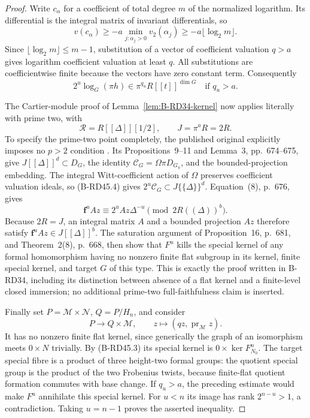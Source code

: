 \begin{proof}
Write $c_\alpha$ for a coefficient of total degree $m$ of
the normalized logarithm. Its differential is the integral
matrix of invariant differentials, so
\[
 v(c_\alpha)\ge
 -a\min_{j:\alpha_j>0}v_2(\alpha_j)
 \ge-a\lfloor\log_2m\rfloor.
\]
Since $\lfloor\log_2m\rfloor\le m-1$, substitution of a
vector of coefficient valuation $q>a$ gives logarithm
coefficient valuation at least $q$. All substitutions are
coefficientwise finite because the vectors have zero constant
term. Consequently
\[
        2^u\log_G(\pi h)\in\pi^{q_u}R[[t]]^{\dim G}
                  \quad\text{if }q_u>a.
 \tag{B-RD45.4}
\]

The Cartier-module proof of Lemma~\ref{lem:B-RD34-kernel}
now applies literally with prime two, with
\[
 \mathcal R=R[[\Delta]][1/2],\qquad J=\pi^aR=2R.
\]
To specify the prime-two point completely, the published original
explicitly imposes no $p>2$ condition
\cite[p.~663]{Bondarko2006Generic}.
Its Propositions~9--11 and Lemma~3, pp.~674--675, give
$J[[\Delta]]^d\subset D_G$, the identity
$\mathcal C_G=\Omega\pi D_{G_\pi}$, and the bounded-projection
embedding. The integral Witt-coefficient action of $\Omega$
preserves coefficient valuation ideals, so (B-RD45.4) gives
$2^u\mathcal C_G\subset J\{\{\Delta\}\}^d$.
Equation~(8), p.~676, gives
\[
 \mathbf f^uAz\equiv2^uAz\Delta^{-u}
                              \pmod{2R((\Delta))^b}.
\]
Because $2R=J$, an integral matrix $A$ and a bounded projection
$Az$ therefore satisfy $\mathbf f^uAz\in J[[\Delta]]^b$.
The saturation argument of Proposition~16, p.~681, and
Theorem~2(8), p.~668, then show that $F^u$ kills the special
kernel of any formal homomorphism having no nonzero finite
flat subgroup in its kernel, finite special kernel, and target
$G$ of this type. This is exactly the proof written in
B-RD34, including its distinction between absence of a flat
kernel and a finite-level closed immersion; no additional
prime-two full-faithfulness claim is inserted.

Finally set $P=\mathcal M\times\mathcal N$, $Q=P/H_n$, and
consider
\[
        P\longrightarrow Q\times\mathcal M,
        \qquad z\longmapsto(qz,\operatorname{pr}_{\mathcal M}z).
\]
It has no nonzero finite flat kernel, since generically the
graph of an isomorphism meets $0\times N$ trivially.
By (B-RD45.3) its special kernel is
$0\times\ker F_{N_0}^n$.
The target special fibre is a product of three height-two
formal groups: the quotient special group is the product of
the two Frobenius twists, because finite-flat quotient formation
commutes with base change. If $q_u>a$, the preceding estimate
would make $F^u$ annihilate this special kernel.
For $u<n$ its image has rank $2^{n-u}>1$, a contradiction.
Taking $u=n-1$ proves the asserted inequality.
\end{proof}

